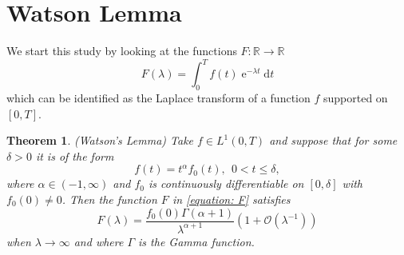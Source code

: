\documentclass[]{report}
\DeclareMathOperator{\ee}{e}
\newcommand{\R}{\mathbb{R}}
\newcommand{\Boh}{\mathcal{O}}
\newcommand{\dd}{\mathrm{d}}
\newtheorem{thm}[lemma]{Theorem}
\numberwithin{equation}{section} %
\begin{document}
\section{Watson Lemma}

We start this study by looking at the functions $F: \R \rightarrow \R$
\begin{equation}
	F(\lambda) = \int_{0}^{T} f(t) \ee^{-\lambda t} \dd t
	\label{equation: F}
\end{equation}
which can be identified as the Laplace transform of a function $f$ supported on $[0,T]$.

\begin{thm}	
	(Watson's Lemma) Take $f \in L^1(0,T)$ and suppose that for some $\delta > 0$ it is of the form
	$$f(t) = t^\alpha f_0(t), \ \ 0 < t \leq \delta,$$
	where $\alpha \in (-1, \infty)$ and $f_0$ is continuously differentiable on $[0, \delta]$ with $f_0(0) \neq 0$. Then the function $F$ in \ref{equation: F} satisfies
	\begin{equation}
		F(\lambda) = \frac{f_0(0) \Gamma(\alpha + 1)}{\lambda^{\alpha + 1}} (1 + \Boh(\lambda^{-1}))
	\end{equation}
	when $\lambda \rightarrow \infty$ and where $\Gamma$ is the Gamma function.
\end{thm}
\end{document}
